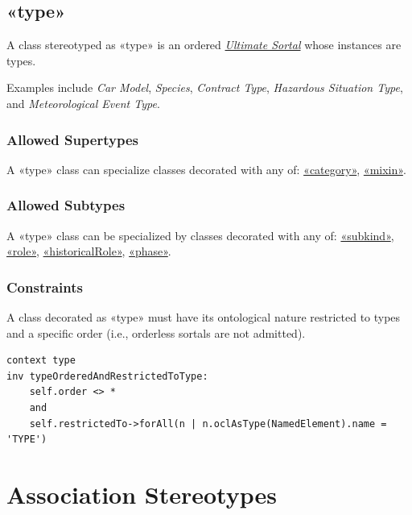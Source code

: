 \subsection{«type»}
\label{stereotype:type}

A class stereotyped as «type» is an ordered \hyperref[stereotype:ultimateSortal]{\textit{Ultimate Sortal}} whose instances are types.

Examples include \textit{Car Model}, \textit{Species}, \textit{Contract Type}, \textit{Hazardous Situation Type}, and \textit{Meteorological Event Type}.

\subsubsection{Allowed Supertypes}

A «type» class can specialize classes decorated with any of: 
\hyperref[stereotype:category]{«category»}, \hyperref[stereotype:mixin]{«mixin»}.

\subsubsection{Allowed Subtypes}

A «type» class can be specialized by classes decorated with any of:
\hyperref[stereotype:subkind]{«subkind»}, \hyperref[stereotype:role]{«role»}, \hyperref[stereotype:historicalRole]{«historicalRole»}, \hyperref[stereotype:phase]{«phase»}.

\subsubsection{Constraints}

\begin{constraint}
\label{constraint:typeOrderedAndRestrictedToType}
A class decorated as «type» must have its ontological nature restricted to types and a specific order (i.e., orderless sortals are not admitted).

\begin{lstlisting}[language=OCL]
context type 
inv typeOrderedAndRestrictedToType:
    self.order <> *
    and
    self.restrictedTo->forAll(n | n.oclAsType(NamedElement).name = 'TYPE')
\end{lstlisting}
\end{constraint}




\section{Association Stereotypes}
\label{sec:mlt-profile-associations}

